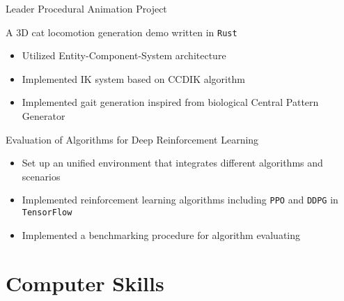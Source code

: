 \documentclass[10pt, a4paper, sans]{moderncv}
\begin{document}
{Leader}
{Procedural Animation Project}
{}{}
{A 3D cat locomotion generation demo written in \texttt{Rust}
	\begin{itemize}
		\item Utilized Entity-Component-System architecture
		\item Implemented IK system based on CCDIK algorithm
		\item Implemented gait generation inspired from biological Central Pattern Generator
	\end{itemize}
}

{{Evaluation of Algorithms for Deep Reinforcement Learning}
	\begin{itemize}
		\item Set up an unified environment that integrates different algorithms and scenarios
		\item Implemented reinforcement learning algorithms including \texttt{PPO} and \texttt{DDPG} in \texttt{TensorFlow}
		\item Implemented a benchmarking procedure for algorithm evaluating
	\end{itemize}
}


\section{Computer Skills}
\end{document}

